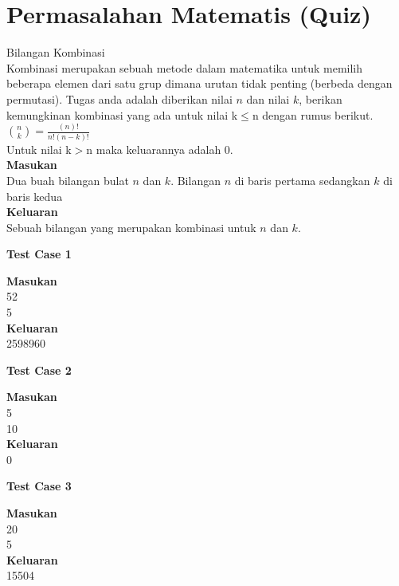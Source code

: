 \chapter{Permasalahan Matematis (Quiz)}

\begin{permasalahan}{Bilangan Kombinasi}\\
	 Kombinasi merupakan sebuah metode dalam matematika untuk memilih beberapa elemen dari satu grup dimana urutan tidak penting (berbeda dengan permutasi). Tugas anda adalah diberikan nilai $n$ dan nilai $k$, berikan kemungkinan kombinasi yang ada untuk nilai k$\leq$n dengan rumus berikut. \\
	 \begin{math}
	 \binom{n}{k}= \frac{(n)!}{n!(n-k)!}	
	\end{math}\\
	Untuk nilai k$>$n maka keluarannya adalah 0.
	\\
	\textbf{Masukan}\\
	Dua buah bilangan bulat $n$ dan $k$. Bilangan $n$ di baris pertama sedangkan $k$ di baris kedua\\
	\textbf{Keluaran}\\
	Sebuah bilangan yang merupakan kombinasi untuk $n$ dan $k$.\\
	\begin{center}
	\textbf{Test Case 1}\\
	\end{center}
	\textbf{Masukan}\\
	52\\
	5\\
	\textbf{Keluaran}\\
	2598960\\
	\begin{center}
	\textbf{Test Case 2}\\
	\end{center}
	\textbf{Masukan}\\
	5\\
	10\\
	\textbf{Keluaran}\\
	0\\
	\begin{center}
	\textbf{Test Case 3}\\
	\end{center}
	\textbf{Masukan}\\
	20\\
	5\\
	\textbf{Keluaran}\\
	15504\\
\end{permasalahan}

